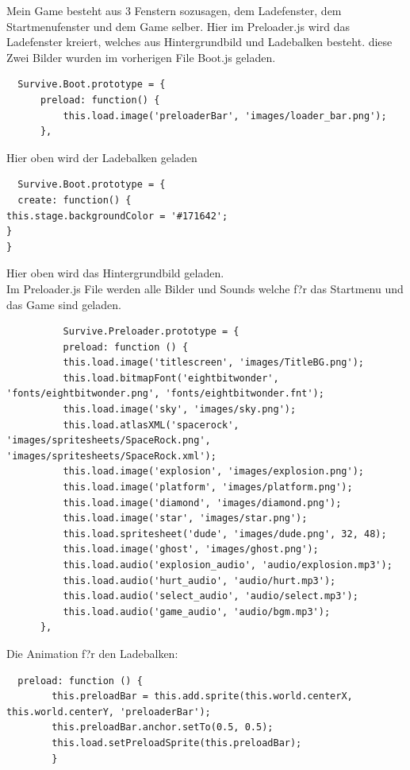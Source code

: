 \documentclass{article}
\begin{document}
Mein Game besteht aus 3 Fenstern sozusagen, dem Ladefenster, dem Startmenufenster und dem Game selber.
Hier im Preloader.js wird das Ladefenster kreiert, welches aus Hintergrundbild und Ladebalken besteht.
diese Zwei Bilder wurden im vorherigen File Boot.js geladen.

\begin{lstlisting}
  Survive.Boot.prototype = {
      preload: function() {
          this.load.image('preloaderBar', 'images/loader_bar.png');
      },
\end{lstlisting}

Hier oben wird der Ladebalken geladen

\begin{lstlisting}
  Survive.Boot.prototype = {
  create: function() {
this.stage.backgroundColor = '#171642';
}
}
\end{lstlisting}
Hier oben wird das Hintergrundbild geladen.\\
Im Preloader.js File werden alle Bilder und Sounds welche f?r das Startmenu und das Game sind geladen.


\begin{lstlisting}
          Survive.Preloader.prototype = {
          preload: function () {
          this.load.image('titlescreen', 'images/TitleBG.png');
          this.load.bitmapFont('eightbitwonder', 'fonts/eightbitwonder.png', 'fonts/eightbitwonder.fnt');
          this.load.image('sky', 'images/sky.png');
          this.load.atlasXML('spacerock', 'images/spritesheets/SpaceRock.png', 'images/spritesheets/SpaceRock.xml');
          this.load.image('explosion', 'images/explosion.png');
          this.load.image('platform', 'images/platform.png');
          this.load.image('diamond', 'images/diamond.png');
          this.load.image('star', 'images/star.png');
          this.load.spritesheet('dude', 'images/dude.png', 32, 48);
          this.load.image('ghost', 'images/ghost.png');
          this.load.audio('explosion_audio', 'audio/explosion.mp3');
          this.load.audio('hurt_audio', 'audio/hurt.mp3');
          this.load.audio('select_audio', 'audio/select.mp3');
          this.load.audio('game_audio', 'audio/bgm.mp3');
      },
\end{lstlisting}


Die Animation f?r den Ladebalken:
\begin{lstlisting}
  preload: function () {
        this.preloadBar = this.add.sprite(this.world.centerX, this.world.centerY, 'preloaderBar');
        this.preloadBar.anchor.setTo(0.5, 0.5);
        this.load.setPreloadSprite(this.preloadBar);
        }
\end{lstlisting}
\end{document}

